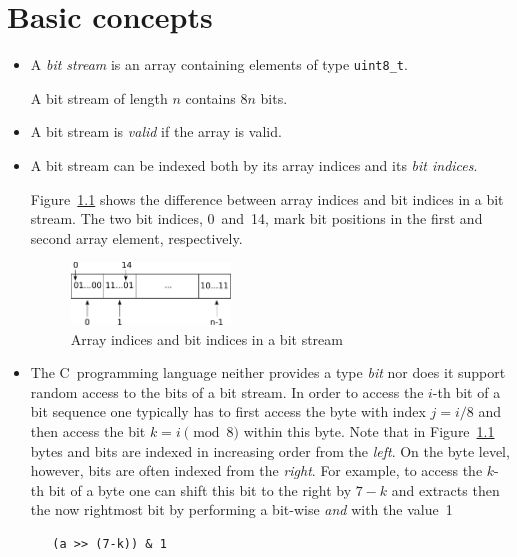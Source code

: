 
\chapter{Basic concepts}
\label{sec:basic}

\begin{itemize}
\item
A \emph{bit stream} is an array containing elements of type \verb"uint8_t".

A bit stream of length $n$ contains $8n$ bits.

\item
A bit stream is \emph{valid} if the array is valid.

\item 
A bit stream can be indexed both by its array indices
and its \emph{bit indices}.

Figure~\ref{fig:bitstream-indices} shows the difference between 
array indices and bit indices in a bit stream.
The two bit indices, 0~and~14,
mark bit positions in the first and second array element, respectively.

\begin{figure}[hbt]
\begin{center}
\includegraphics[width=0.40\textwidth]{figures/array_as_stream.pdf}
\caption{\label{fig:bitstream-indices} Array indices and bit indices in a bit stream}
\end{center}
\end{figure}

\item 
The C~programming language neither provides a type \emph{bit}
nor does it support random access to the bits of a bit stream.
In order to access the $i$-th bit of a bit sequence one typically
has to first access the byte with index $j = i/8$ and then access the 
bit $k = i \pmod{8}$ within this byte.
Note that in Figure~\ref{fig:bitstream-indices} 
bytes and bits are indexed in increasing order from the \emph{left}.
On the byte level, however, bits are often indexed from the \emph{right}.
For example, to access the $k$-th bit of a byte  one can
shift this bit to the right by $7-k$ and extracts then the now
rightmost bit by performing a bit-wise \emph{and} with the value~1
%
\begin{verbatim}
   (a >> (7-k)) & 1
\end{verbatim}


\end{itemize}
